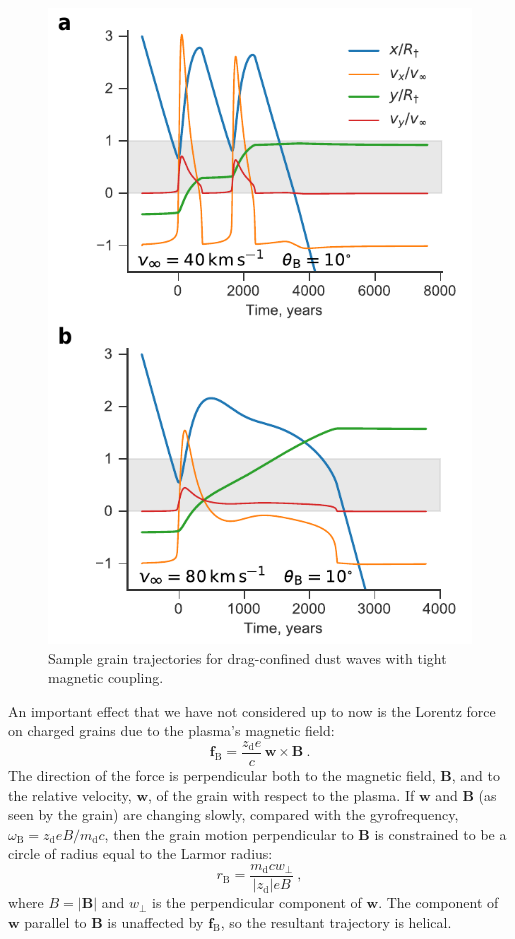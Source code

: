 \message{ !name(dusty-bow-wave.tex)}\documentclass[useAMS, usenatbib, a4paper]{mnras}
\providecommand{\abs}[1]{\lvert#1\rvert}
\newcommand{\grain}{\ensuremath{_{\text{d}}}}
\newcommand{\B}{\ensuremath{_{\scriptscriptstyle\text{B}}}}
\begin{document}
\begin{figure}
  \centering
  \includegraphics[width=\linewidth]{figs/frozen-trajectories-multi}
  \caption{Sample grain trajectories for drag-confined dust waves with
    tight magnetic coupling.}
  \label{fig:frozen-trajectories}
\end{figure}

An important effect that we have not considered up to now is the
Lorentz force on charged grains due to the plasma's magnetic field:
\begin{equation}
  \label{eq:f-lorentz}
  \bm{f}\!\B = \frac{z\grain e}{c} \, \bm{w} \times \bm{B} \ . 
\end{equation}
The direction of the force is perpendicular both to the magnetic
field, \(\bm{B}\), and to the relative velocity, \(\bm{w}\), of the
grain with respect to the plasma.  If \(\bm{w}\) and \(\bm{B}\) (as
seen by the grain) are changing slowly, compared with the
gyrofrequency, \(\omega\B = z\grain e B / m\grain c\), then the grain
motion perpendicular to \(\bm{B}\) is constrained to be a circle of
radius equal to the Larmor radius:
\begin{equation}
  \label{eq:Larmor}
  r\B = \frac{m\grain c w_\perp} {\abs{z\grain} e B} \ ,
\end{equation}
where \(B = \abs{\bm{B}}\) and \(w_\perp\) is the perpendicular component
of \(\bm{w}\).  The component of \(\bm{w}\) parallel to \(\bm{B}\) is
unaffected by \(\bm{f}\!\B\), so the resultant trajectory is helical.
\end{document}
